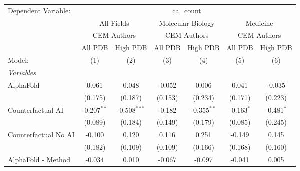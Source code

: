 \begingroup
\centering
\begin{tabular}{lcccccc}
   \tabularnewline \midrule \midrule
   Dependent Variable: & \multicolumn{6}{c}{ca\_count}\\
 & \multicolumn{2}{c}{All Fields} & \multicolumn{2}{c}{Molecular Biology} & \multicolumn{2}{c}{Medicine} \\
\cmidrule(lr){2-3} \cmidrule(lr){4-5} \cmidrule(lr){6-7}
 & \multicolumn{2}{c}{CEM Authors} & \multicolumn{2}{c}{CEM Authors} & \multicolumn{2}{c}{CEM Authors} \\
\cmidrule(lr){2-3} \cmidrule(lr){4-5} \cmidrule(lr){6-7}
 & \multicolumn{1}{c}{All PDB} & \multicolumn{1}{c}{High PDB} & \multicolumn{1}{c}{All PDB} & \multicolumn{1}{c}{High PDB} & \multicolumn{1}{c}{All PDB} & \multicolumn{1}{c}{High PDB} \\
\cmidrule(lr){2-2} \cmidrule(lr){3-3} \cmidrule(lr){4-4} \cmidrule(lr){5-5} \cmidrule(lr){6-6} \cmidrule(lr){7-7}
   Model:                                                     & (1)           & (2)            & (3)          & (4)           & (5)           & (6)\\  
   \midrule
   \emph{Variables}\\
   AlphaFold                                                  & 0.061         & 0.048          & -0.052       & 0.006         & 0.041         & -0.035\\   
                                                              & (0.175)       & (0.187)        & (0.153)      & (0.234)       & (0.171)       & (0.223)\\   
   Counterfactual AI                                          & -0.207$^{**}$ & -0.508$^{***}$ & -0.182       & -0.355$^{**}$ & -0.163$^{*}$  & -0.481$^{*}$\\   
                                                              & (0.089)       & (0.184)        & (0.149)      & (0.179)       & (0.085)       & (0.245)\\   
   Counterfactual No AI                                       & -0.100        & 0.120          & 0.116        & 0.251         & -0.149        & 0.145\\   
                                                              & (0.182)       & (0.109)        & (0.109)      & (0.166)       & (0.168)       & (0.160)\\   
   AlphaFold - Method                                         & -0.034        & 0.010          & -0.067       & -0.097        & -0.041        & 0.005\\   

\end{tabular}
